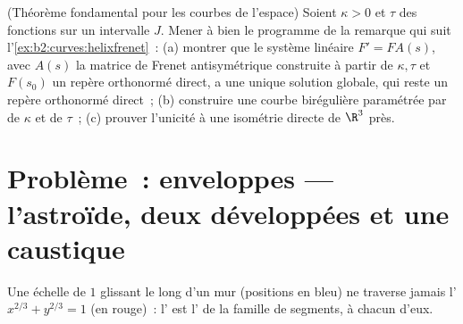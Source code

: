 \begin{exercise}[$\star\star\star$]\label{exo:b2:curves:12}
(Théorème fondamental pour les courbes de l'espace) Soient $\kappa
> 0$ et $\tau$ des fonctions  sur un intervalle $J$. Mener
à bien le programme de la remarque qui suit
l'\cref{ex:b2:curves:helixfrenet}~: (a) montrer que le système
linéaire $F' = FA(s)$, avec $A(s)$ la matrice de Frenet
antisymétrique construite à partir de $\kappa, \tau$ et $F(s_0)$ un
repère orthonormé direct, a une unique solution globale, qui reste
un repère orthonormé direct~; (b) construire une courbe
birégulière paramétrée par  de  $\kappa$ et
de  $\tau$~;
(c) prouver l'unicité à une isométrie directe de $\R^3$ près.
\end{exercise}

\section{Problème~: enveloppes --- l'astroïde, deux développées et
une caustique}

\begin{omfigure}

{\small Une échelle de  $1$ glissant le long d'un mur
(positions en bleu) ne traverse jamais l' $x^{2/3} +
y^{2/3} = 1$
(en rouge)~: l' est l'\emph{} de la famille de
segments,  à chacun d'eux.}
\end{omfigure}

